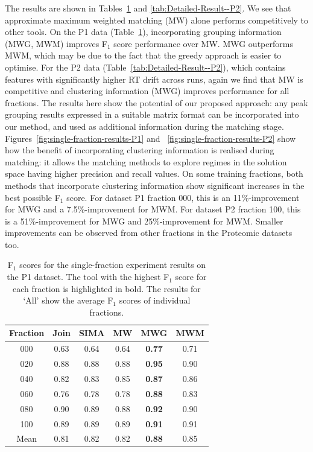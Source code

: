 The results are shown in Tables~\ref{tab:Detailed-Result--P1} and \ref{tab:Detailed-Result--P2}. We see that approximate maximum weighted matching (MW) alone performs competitively to other tools. On the P1 data (Table~\ref{tab:Detailed-Result--P1}), incorporating grouping information (MWG, MWM) improves F$_{1}$ score performance over MW. MWG outperforms MWM, which may be due to the fact that the greedy approach is easier to optimise. For the P2 data (Table~\ref{tab:Detailed-Result--P2}), which contains features with significantly higher RT drift across runs, again we find that MW is competitive and clustering information (MWG) improves performance for all fractions. The results here show the potential of our proposed approach: any peak grouping results expressed in a suitable matrix format can be incorporated into our method, and used as additional information during the matching stage. Figures~\ref{fig:single-fraction-results-P1} and ~\ref{fig:single-fraction-results-P2} show how the benefit of incorporating clustering information is realised during matching: it allows the matching methods to explore regimes in the solution space having higher precision and recall values. On some training fractions, both methods that incorporate clustering information show significant increases in the best possible F$_1$ score. For dataset P1 fraction 000, this is an 11\%-improvement for MWG and a 7.5\%-improvement for MWM. For dataset P2 fraction 100, this is a 51\%-improvement for MWG and 25\%-improvement for MWM. Smaller improvements can be observed from other fractions in the Proteomic datasets too.

\begin{table}[!htbp]
\begin{centering}
\begin{tabular}{|c|c|c|c|c|c|}
\hline 
{Fraction} & {Join} & {SIMA} & {MW} & {MWG} & {MWM}\tabularnewline
\hline 
\hline 
{000} & {0.63} & {0.64} & {0.64} & \textbf{0.77} & {0.71}\tabularnewline
\hline 
{020} & {0.88} & {0.88} & {0.88} & \textbf{0.95} & {0.90}\tabularnewline
\hline 
{040} & {0.82} & {0.83} & {0.85} & \textbf{0.87} & {0.86}\tabularnewline
\hline 
{060} & {0.76} & {0.78} & {0.78} & \textbf{0.88} & {0.83}\tabularnewline
\hline 
{080} & {0.90} & {0.89} & {0.88} & \textbf{0.92} & {0.90}\tabularnewline
\hline 
{100} & {0.89} & {0.89} & {0.89} & \textbf{0.91} & {0.91}\tabularnewline
\hline 
{Mean} & {0.81} & {0.82} & {0.82} & \textbf{0.88} & {0.85}\tabularnewline
\hline 
\end{tabular}
\par\end{centering}
\caption[F$_1$ scores for the single-fraction experiment results on the P1 dataset.]{\label{tab:Detailed-Result--P1}F$_1$ scores for the single-fraction experiment results on the P1 dataset. The tool with the highest F$_1$ score for each fraction is highlighted in bold. The results for `All' show the average F$_1$ scores of individual fractions.}
\end{table}

